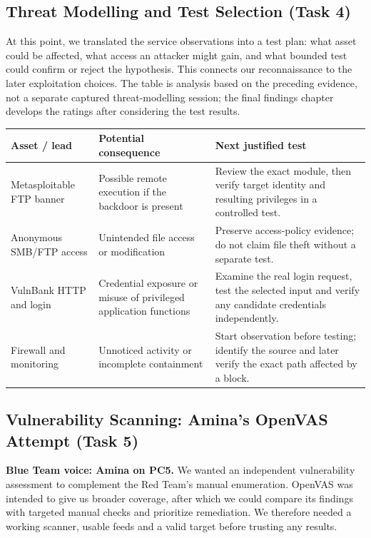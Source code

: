 \documentclass[11pt,a4paper]{article}
\begin{document}
\subsection{Threat Modelling and Test Selection (Task 4)}
\label{phase:threat}
At this point, we translated the service observations into a test plan: what asset could be affected, what access an attacker might gain, and what bounded test could confirm or reject the hypothesis. This connects our reconnaissance to the later exploitation choices. The table is analysis based on the preceding evidence, not a separate captured threat-modelling session; the final findings chapter develops the ratings after considering the test results.
\begin{tabularx}{\linewidth}{@{}L{3.2cm}X X@{}}
\toprule
\textbf{Asset / lead} & \textbf{Potential consequence} & \textbf{Next justified test}\\
\midrule
Metasploitable FTP banner & Possible remote execution if the backdoor is present & Review the exact module, then verify target identity and resulting privileges in a controlled test.\\
Anonymous SMB/FTP access & Unintended file access or modification & Preserve access-policy evidence; do not claim file theft without a separate test.\\
VulnBank HTTP and login & Credential exposure or misuse of privileged application functions & Examine the real login request, test the selected input and verify any candidate credentials independently.\\
Firewall and monitoring & Unnoticed activity or incomplete containment & Start observation before testing; identify the source and later verify the exact path affected by a block.\\
\bottomrule
\end{tabularx}

\subsection{Vulnerability Scanning: Amina's OpenVAS Attempt (Task 5)}
\label{phase:assessment}
\textbf{Blue Team voice: Amina on PC5.} We wanted an independent vulnerability assessment to complement the Red Team's manual enumeration. OpenVAS was intended to give us broader coverage, after which we could compare its findings with targeted manual checks and prioritize remediation. We therefore needed a working scanner, usable feeds and a valid target before trusting any results.
\end{document}
